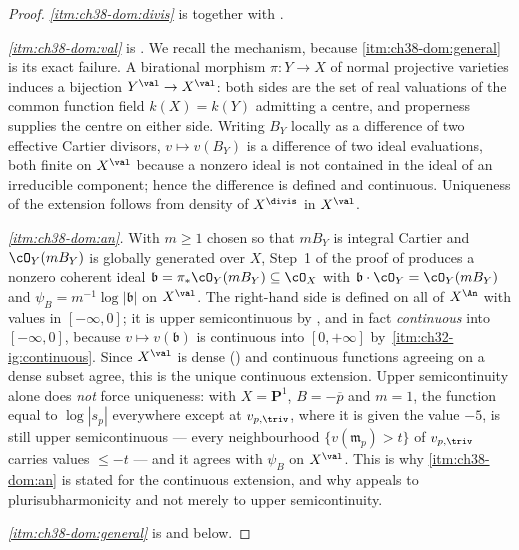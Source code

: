 \begin{proof}
\emph{\cref{itm:ch38-dom:divis}} is
 together with
.

\emph{\cref{itm:ch38-dom:val}} is
.  We recall the mechanism,
because \cref{itm:ch38-dom:general} is its exact failure.  A birational
morphism $\pi:Y\to X$ of normal projective varieties induces a bijection
$Y^{\val}\to X^{\val}$: both sides are the set of real valuations of the
common function field $k(X)=k(Y)$ admitting a centre, and properness
supplies the centre on either side.  Writing $B_Y$ locally as a
difference of two effective Cartier divisors, $v\mapsto v(B_Y)$ is a
difference of two ideal evaluations, both finite on $X^{\val}$ because a
nonzero ideal is not contained in the ideal of an irreducible component;
hence the difference is defined and continuous.  Uniqueness of the
extension follows from density of $X^{\divis}$ in $X^{\val}$.

\emph{\cref{itm:ch38-dom:an}.}  With $m\geq1$ chosen so that $mB_Y$ is
integral Cartier and $\cO_Y(mB_Y)$ is globally generated over $X$,
Step~1 of the proof of  produces a
nonzero coherent ideal $\mathfrak b=\pi_*\cO_Y(mB_Y)\subseteq\cO_X$ with
$\mathfrak b\cdot\cO_Y=\cO_Y(mB_Y)$ and
$\psi_B=m^{-1}\log|\mathfrak b|$ on $X^{\val}$.  The right-hand side is
defined on all of $X^{\An}$ with values in $[-\infty,0]$; it is upper
semicontinuous by , and in fact
\emph{continuous} into $[-\infty,0]$, because
$v\mapsto v(\mathfrak b)$ is continuous into $[0,+\infty]$ by
\,\cref{itm:ch32-ig:continuous}.  Since
$X^{\val}$ is dense () and continuous
functions agreeing on a dense subset agree, this is the unique continuous
extension.  Upper semicontinuity alone does \emph{not} force uniqueness:
with $X=\mathbf P^1$, $B=-\overline p$ and $m=1$, the function equal
to $\log|s_p|$ everywhere except at $v_{p,\triv}$, where it is given
the value $-5$, is still upper semicontinuous --- every neighbourhood
$\{v(\mathfrak m_p)>t\}$ of $v_{p,\triv}$ carries values $\leq-t$ ---
and it agrees with $\psi_B$ on $X^{\val}$.  This is why
\cref{itm:ch38-dom:an} is stated for the continuous extension, and why
 appeals to plurisubharmonicity and
not merely to upper semicontinuity.

\emph{\cref{itm:ch38-dom:general}} is
 and
 below.
\end{proof}

